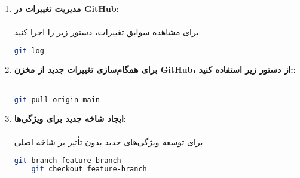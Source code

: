 \begin{enumerate}
     \item \textbf{مدیریت تغییرات در GitHub}:\\\\
     برای مشاهده سوابق تغییرات، دستور زیر را اجرا کنید:
     \begin{LTR}
    \begin{lstlisting}[language=bash]
    git log
    \end{lstlisting}
    \end{LTR} 

    \item \textbf{برای همگام‌سازی تغییرات جدید از مخزن GitHub، از دستور زیر استفاده کنید:}:\\\\
    \begin{LTR}
    \begin{lstlisting}[language=bash]
    git pull origin main
    \end{lstlisting}
    \end{LTR} 

    \item \textbf{ایجاد شاخه جدید برای ویژگی‌ها}:\\\\
    برای توسعه ویژگی‌های جدید بدون تأثیر بر شاخه اصلی:
    \begin{LTR}
    \begin{lstlisting}[language=bash]
    git branch feature-branch
    git checkout feature-branch
    \end{lstlisting}
    \end{LTR} 
    
    
\end{enumerate}




